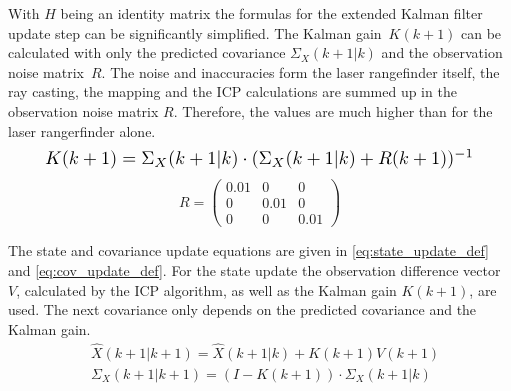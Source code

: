 With $H$ being an identity matrix the formulas for the extended Kalman filter update step can be significantly simplified. The Kalman \mbox{gain $K(k+1)$} can be calculated with only the predicted covariance $\Sigma_{X}(k+1|k)$ and the observation noise \mbox{matrix $R$}. The noise and inaccuracies form the laser rangefinder itself, the ray casting, the mapping and the ICP calculations are summed up in the observation noise matrix $R$. Therefore, the values are much higher than for the laser rangerfinder alone.
\begin{equation}\label{eq:Kalman_def}
    \resizebox{0.89\hsize}{!}{%
        $K(k+1)= \Sigma_{X}(k+1|k)\cdot {(\Sigma_{X}(k+1|k) + R(k+1)})^{-1} $%
        }
\end{equation}
\begin{equation}
R= \begin{pmatrix} 0.01 & 0 & 0 \\ 0 & 0.01 & 0 \\ 0 & 0 & 0.01\end{pmatrix}\label{R_def}
\end{equation}

The state and covariance update equations are given in \eqref{eq:state_update_def} and \eqref{eq:cov_update_def}. For the state update the observation difference vector $V$, calculated by the ICP algorithm, as well as the Kalman gain $K(k+1)$, are used. The next covariance only depends on the predicted covariance and the Kalman gain.
\begin{align}
& \hat{X}(k+1|k+1) = \hat{X}(k+1|k) + K(k+1)V(k+1) \label{eq:state_update_def} \\
& \Sigma_{X}(k+1|k+1) = (I-K(k+1))\cdot\Sigma_{X}(k+1|k) \label{eq:cov_update_def}
\end{align}


